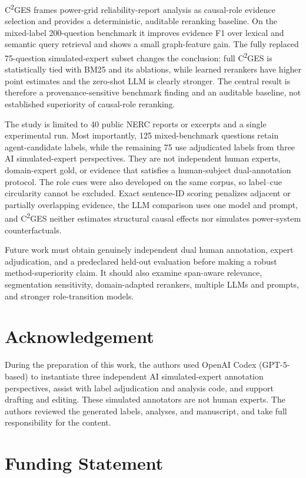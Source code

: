 \documentclass{article}
\begin{document}
C\textsuperscript{2}GES frames power-grid reliability-report analysis as causal-role evidence selection and provides a deterministic, auditable reranking baseline. On the mixed-label 200-question benchmark it improves evidence F1 over lexical and semantic query retrieval and shows a small graph-feature gain. The fully replaced 75-question simulated-expert subset changes the conclusion: full C\textsuperscript{2}GES is statistically tied with BM25 and its ablations, while learned rerankers have higher point estimates and the zero-shot LLM is clearly stronger. The central result is therefore a provenance-sensitive benchmark finding and an auditable baseline, not established superiority of causal-role reranking.

The study is limited to 40 public NERC reports or excerpts and a single experimental run. Most importantly, 125 mixed-benchmark questions retain agent-candidate labels, while the remaining 75 use adjudicated labels from three AI simulated-expert perspectives. They are not independent human experts, domain-expert gold, or evidence that satisfies a human-subject dual-annotation protocol. The role cues were also developed on the same corpus, so label--cue circularity cannot be excluded. Exact sentence-ID scoring penalizes adjacent or partially overlapping evidence, the LLM comparison uses one model and prompt, and C\textsuperscript{2}GES neither estimates structural causal effects nor simulates power-system counterfactuals.

Future work must obtain genuinely independent dual human annotation, expert adjudication, and a predeclared held-out evaluation before making a robust method-superiority claim. It should also examine span-aware relevance, segmentation sensitivity, domain-adapted rerankers, multiple LLMs and prompts, and stronger role-transition models.

\section*{Acknowledgement}

During the preparation of this work, the authors used OpenAI Codex (GPT-5-based) to instantiate three independent AI simulated-expert annotation perspectives, assist with label adjudication and analysis code, and support drafting and editing. These simulated annotators are not human experts. The authors reviewed the generated labels, analyses, and manuscript, and take full responsibility for the content.
\section*{Funding Statement}
\end{document}
